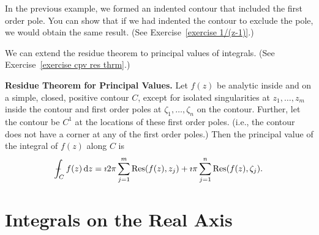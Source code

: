 In the previous example, we formed an indented contour that included the
first order pole.  You can show that if we had indented the contour to
exclude the pole, we would obtain the same result.  (See 
Exercise~\ref{exercise 1/(z-1)}.)



We can extend the residue theorem to principal values of integrals.
(See Exercise~\ref{exercise cpv res thrm}.)

\begin{Result}
  \label{result residue theorem principal values}
  \textbf{Residue Theorem for Principal Values.}
  Let $f(z)$ be analytic inside and on a simple, closed, positive contour $C$,
  except for isolated singularities at $z_1,\ldots,z_m$ inside the contour 
  and first order poles at $\zeta_1,\ldots,\zeta_n$
  on the contour.  Further, let the contour be $C^1$ at the locations of these
  first order poles. (i.e., the contour does not have a corner at any of the
  first order poles.)  Then the principal value of the integral of $f(z)$
  along $C$ is
  \[
  - \negthickspace \negthickspace \negthickspace \negmedspace \int_C f(z) \,\mathrm{d} z = \imath 2 \pi \sum_{j=1}^m \mathop{\mathrm{Res}}\nolimits(f(z),z_j)
  + \imath \pi \sum_{j=1}^n \mathop{\mathrm{Res}}\nolimits(f(z),\zeta_j).
  \]
\end{Result}








































\section{Integrals on the Real Axis}








